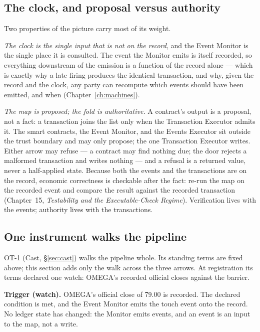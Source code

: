 \documentclass[11pt,a4paper]{article}
\begin{document}
\subsection{The clock, and proposal versus authority}

Two properties of the picture carry most of its weight.

\emph{The clock is the single input that is not on the record}, and the Event Monitor is
the single place it is consulted. The event the Monitor emits is itself recorded, so
everything downstream of the emission is a function of the record alone --- which is
exactly why a late firing produces the identical transaction, and why, given the record
and the clock, any party can recompute which events should have been emitted, and when
(Chapter~\ref{ch:machines}).

\emph{The map is proposed; the fold is authoritative.} A contract's output is a proposal,
not a fact: a transaction joins the list only when the Transaction Executor admits it. The
smart contracts, the Event Monitor, and the Events Executor sit outside the trust boundary
and may only propose; the one Transaction Executor writes. Either arrow may refuse --- a
contract may find nothing due; the door rejects a malformed transaction and writes nothing
--- and a refusal is a returned value, never a half-applied state. Because both the events
and the transactions are on the record, economic correctness is checkable after the fact:
re-run the map on the recorded event and compare the result against the recorded
transaction (Chapter~15, \emph{Testability and the Executable-Check Regime}). Verification
lives with the events; authority lives with the transactions.

\subsection{One instrument walks the pipeline}

OT-1 (Cast, \S\ref{sec:cast}) walks the pipeline whole. Its standing terms are fixed above;
this section adds only the walk across the three arrows. At registration its terms declared
one watch: OMEGA's recorded official closes against the barrier.

\textbf{Trigger (watch).} OMEGA's official close of 79.00 is recorded. The declared
condition is met, and the Event Monitor emits the touch event
onto the record. No ledger state has changed: the Monitor emits events, and an event is an
input to the map, not a write.
\end{document}
